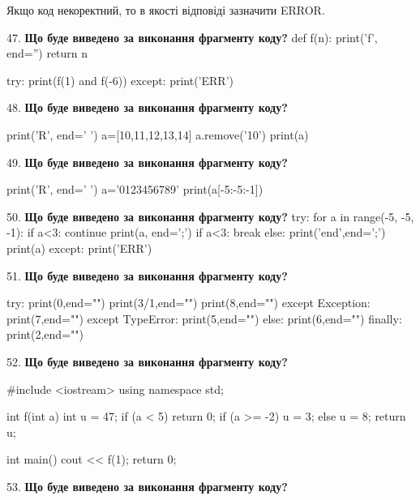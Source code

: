 \documentclass[11pt]{article}
\begin{document}
Якщо код некоректний, то в якості відповіді зазначити ERROR.


\par\vspace{5mm}
47. \textbf{Що буде виведено за виконання фрагменту коду?}
def f(n):
    print('f', end='')
    return n

try:
    print(f(1) and f(-6))
except:
    print('ERR')
\par\vspace{5mm}
48. \textbf{Що буде виведено за виконання фрагменту коду?}

print('R', end=' ')
a=[10,11,12,13,14]
a.remove('10')
print(a)

\par\vspace{5mm}
49. \textbf{Що буде виведено за виконання фрагменту коду?}

print('R', end=' ')
a='0123456789'
print(a[-5:-5:-1])

\par\vspace{5mm}
50. \textbf{Що буде виведено за виконання фрагменту коду?}
try:
    for a in range(-5, -5, -1):
        if a<3:
            continue
        print(a, end=';')
        if a<3:
            break
    else:
        print('end',end=';')
    print(a)
except:
    print('ERR')
\par\vspace{5mm}
51. \textbf{Що буде виведено за виконання фрагменту коду?}

try:
    print(0,end="")
    print(3/1,end="")
    print(8,end="")
except Exception: print(7,end="")
except TypeError: print(5,end="")
else: print(6,end="")
finally: print(2,end="")
\par\vspace{5mm}
52. \textbf{Що буде виведено за виконання фрагменту коду?}

#include <iostream>
using namespace std;

int f(int a){
    int u = 47;
    if (a < 5) 
        return 0;
    if (a >= -2)
         u = 3;
    else
         u = 8;
    return u;
}

int main(){
    cout << f(1);
    return 0;
}

\par\vspace{5mm}
53. \textbf{Що буде виведено за виконання фрагменту коду?}
\end{document}
